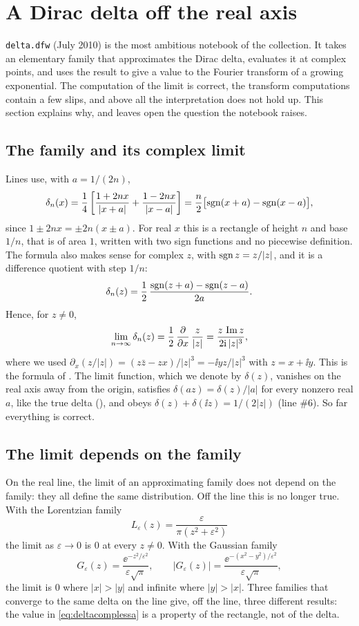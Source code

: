 \section{A Dirac delta off the real axis}
\label{sec:delta}

\texttt{delta.dfw} (July 2010) is the most ambitious notebook of the
collection. It takes an elementary family that approximates the Dirac delta,
evaluates it at complex points, and uses the result to give a value to the
Fourier transform of a growing exponential. The computation of the limit is
correct, the transform computations contain a few slips, and above all the
interpretation does not hold up. This section explains why, and
leaves open the question the notebook raises.

\subsection{The family and its complex limit}

Lines  use, with $a=1/(2n)$,
\[
  \delta_n(x)=\frac14\left[\frac{1+2nx}{|x+a|}+\frac{1-2nx}{|x-a|}\right]
  =\frac n2\bigl[\operatorname{sgn}(x+a)-\operatorname{sgn}(x-a)\bigr],
\]
since $1\pm2nx=\pm2n(x\pm a)$. For real $x$ this is a rectangle of height $n$
and base $1/n$, that is of area $1$, written with two sign functions and no
piecewise definition. The formula also makes sense for complex $z$, with
$\operatorname{sgn} z=z/|z|$, and it is a difference quotient with step $1/n$:
\[
  \delta_n(z)=\frac12\,\frac{\operatorname{sgn}(z+a)-\operatorname{sgn}(z-a)}{2a}.
\]
Hence, for $z\neq0$,
\begin{equation}\label{eq:deltacomplessa}
  \lim_{n\to\infty}\delta_n(z)=\frac12\,\frac{\partial}{\partial x}\,\frac{z}{|z|}
  =\frac{z\,\operatorname{Im} z}{2\mathrm{i}\,|z|^3},
\end{equation}
where we used $\partial_x(z/|z|)=(z\bar z-zx)/|z|^3=-\ii yz/|z|^3$ with
$z=x+\ii y$. This is the formula of . The limit function,
which we denote by $\delta(z)$, vanishes on the real axis away from the
origin, satisfies $\delta(az)=\delta(z)/|a|$ for every nonzero real $a$, like
the true delta (), and obeys
$\delta(z)+\delta(\ii z)=1/(2|z|)$ (line \#6). So far everything is correct.

\subsection{The limit depends on the family}

On the real line, the limit of an approximating family does not depend on the
family: they all define the same distribution. Off the line this is no longer
true. With the Lorentzian family
\[
  L_\varepsilon(z)=\frac{\varepsilon}{\pi(z^2+\varepsilon^2)}
\]
the limit as $\varepsilon\to0$ is $0$ at every $z\neq0$. With the Gaussian
family
\[
  G_\varepsilon(z)=\frac{\ee^{-z^2/\varepsilon^2}}{\varepsilon\sqrt\pi},
  \qquad |G_\varepsilon(z)|=\frac{\ee^{-(x^2-y^2)/\varepsilon^2}}{\varepsilon\sqrt\pi},
\]
the limit is $0$ where $|x|>|y|$ and infinite where $|y|>|x|$. Three families
that converge to the same delta on the line give, off the line, three
different results: the value in \eqref{eq:deltacomplessa} is a property of
the rectangle, not of the delta.

